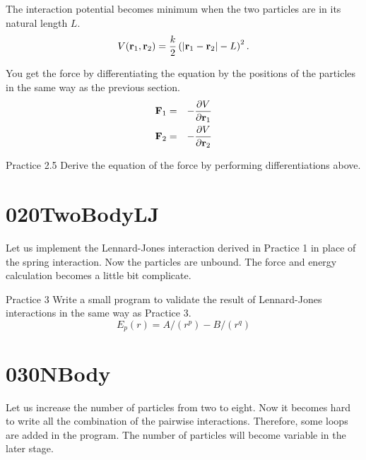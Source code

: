 \documentclass[a4,10pt]{article}
\begin{document}
The interaction potential becomes minimum when the two particles are in its natural length $L$.
\begin{equation}
V({\bf r}_1, {\bf r}_2) = \frac{k}{2}\left(\left|{\bf r}_1-{\bf r}_2\right| - L\right)^2.
\end{equation}

You get the force by differentiating the equation by the positions of
the particles in the same way as the previous section.
\begin{eqnarray}
{\bf F}_1&=& -\frac{\partial V}{\partial{\bf r}_1}\\
{\bf F}_2&=& -\frac{\partial V}{\partial{\bf r}_2}\\
\end{eqnarray}

\begin{itembox}[l]{Practice 2.5}
Derive the equation of the force by performing differentiations above.
\end{itembox}


\section{020TwoBodyLJ}

Let us implement the Lennard-Jones interaction derived in Practice 1 in place of the spring interaction.  Now the particles are unbound.  The force and energy calculation becomes a little bit complicate.

\begin{itembox}[l]{Practice 3}
Write a small program to validate the result of Lennard-Jones interactions in the same way as Practice 3.
\begin{equation}
    E_p(r) = A/(r^p) - B/(r^q)
\end{equation}
\end{itembox}


\section{030NBody}

Let us increase the number of particles from two to eight.
Now it becomes hard to write all the combination of the pairwise interactions.
Therefore, some loops are added in the program.
The number of particles will become variable in the later stage.
\end{document}
